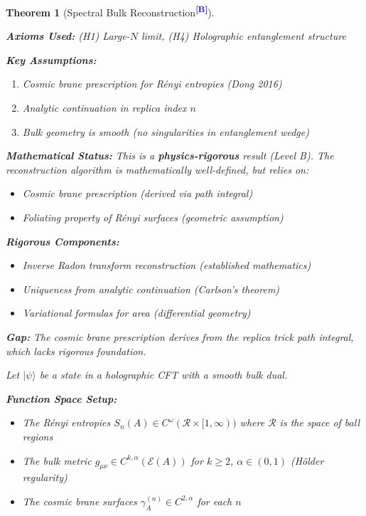 \documentclass[12pt,a4paper]{article}
\newtheorem{theorem}{Theorem}[section]
\newcommand{\levelB}{\textsuperscript{\textcolor{blue}{\textbf{[B]}}}}
\begin{document}
\begin{theorem}[Spectral Bulk Reconstruction\levelB]\label{thm:spectral-reconstruction}

\begin{assumptionbox}
\textbf{Axioms Used:} (H1) Large-$N$ limit, (H4) Holographic entanglement structure

\textbf{Key Assumptions:}
\begin{enumerate}
    \item Cosmic brane prescription for R\'enyi entropies (Dong 2016)
    \item Analytic continuation in replica index $n$
    \item Bulk geometry is smooth (no singularities in entanglement wedge)
\end{enumerate}

\textbf{Mathematical Status:} This is a \textbf{physics-rigorous} result (Level B). The reconstruction algorithm is mathematically well-defined, but relies on:
\begin{itemize}
    \item Cosmic brane prescription (derived via path integral)
    \item Foliating property of R\'enyi surfaces (geometric assumption)
\end{itemize}

\textbf{Rigorous Components:}
\begin{itemize}
    \item Inverse Radon transform reconstruction (established mathematics)
    \item Uniqueness from analytic continuation (Carlson's theorem)
    \item Variational formulas for area (differential geometry)
\end{itemize}

\textbf{Gap:} The cosmic brane prescription derives from the replica trick path integral, which lacks rigorous foundation.
\end{assumptionbox}

Let $|\psi\rangle$ be a state in a holographic CFT with a smooth bulk dual.

\textbf{Function Space Setup:}
\begin{itemize}
    \item The R\'enyi entropies $S_n(A) \in C^\omega(\mathcal{R} \times [1,\infty))$ where $\mathcal{R}$ is the space of ball regions
    \item The bulk metric $g_{\mu\nu} \in C^{k,\alpha}(\mathcal{E}(A))$ for $k \geq 2$, $\alpha \in (0,1)$ (H\"older regularity)
    \item The cosmic brane surfaces $\gamma_A^{(n)} \in C^{2,\alpha}$ for each $n$
\end{itemize}


\end{theorem}
\end{document}
